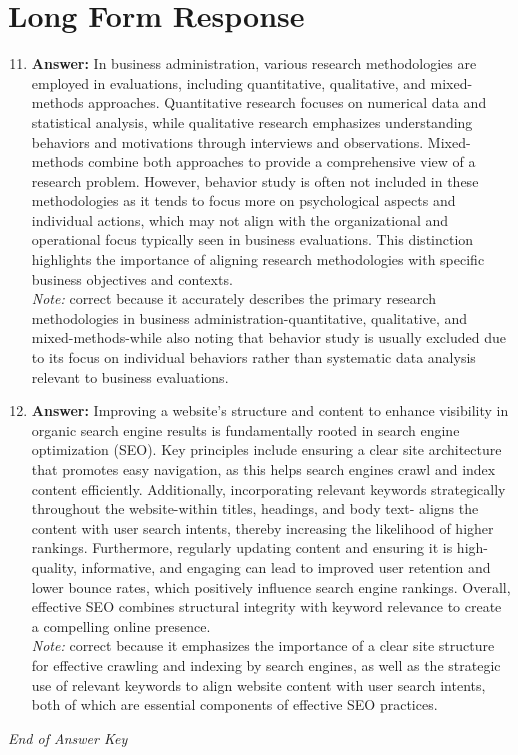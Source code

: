 \documentclass[12pt]{article}
\begin{document}
\section*{Long Form Response}
\begin{enumerate}[label=\arabic*.]
\setcounter{enumi}{10}
\item \textbf{Answer:} In business administration, various research methodologies are employed in evaluations, including quantitative, qualitative, and mixed-methods approaches. Quantitative research focuses on numerical data and statistical analysis, while qualitative research emphasizes understanding behaviors and motivations through interviews and observations. Mixed-methods combine both approaches to provide a comprehensive view of a research problem. However, behavior study is often not included in these methodologies as it tends to focus more on psychological aspects and individual actions, which may not align with the organizational and operational focus typically seen in business evaluations. This distinction highlights the importance of aligning research methodologies with specific business objectives and contexts.
\\ \textit{Note:} correct because it accurately describes the primary research methodologies in business administration-quantitative, qualitative, and mixed-methods-while also noting that behavior study is usually excluded due to its focus on individual behaviors rather than systematic data analysis relevant to business evaluations.
\item \textbf{Answer:} Improving a website's structure and content to enhance visibility in organic search engine results is fundamentally rooted in search engine optimization (SEO). Key principles include ensuring a clear site architecture that promotes easy navigation, as this helps search engines crawl and index content efficiently. Additionally, incorporating relevant keywords strategically throughout the website-within titles, headings, and body text- aligns the content with user search intents, thereby increasing the likelihood of higher rankings. Furthermore, regularly updating content and ensuring it is high-quality, informative, and engaging can lead to improved user retention and lower bounce rates, which positively influence search engine rankings. Overall, effective SEO combines structural integrity with keyword relevance to create a compelling online presence.
\\ \textit{Note:} correct because it emphasizes the importance of a clear site structure for effective crawling and indexing by search engines, as well as the strategic use of relevant keywords to align website content with user search intents, both of which are essential components of effective SEO practices.
\end{enumerate}

\vfill
\noindent\textit{End of Answer Key}
\end{document}

